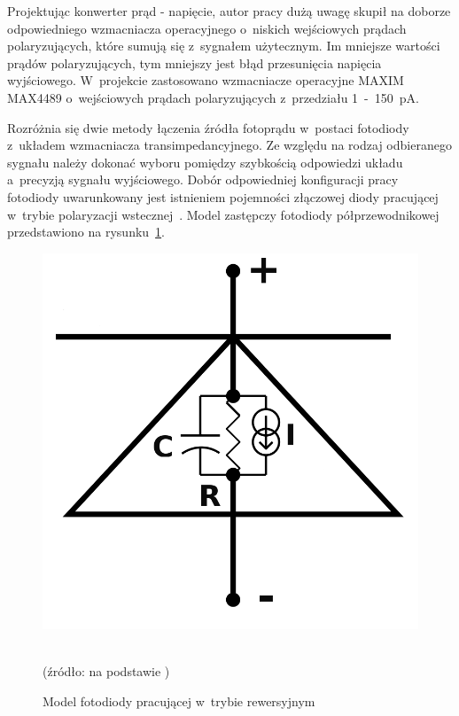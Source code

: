 Projektując konwerter prąd - napięcie, autor pracy dużą uwagę skupił na doborze odpowiedniego wzmacniacza operacyjnego o~niskich wejściowych prądach polaryzujących, które sumują się z~sygnałem użytecznym. 
Im mniejsze wartości prądów polaryzujących, tym mniejszy jest błąd przesunięcia napięcia wyjściowego. W~projekcie zastosowano wzmacniacze operacyjne MAXIM MAX4489 o~wejściowych prądach polaryzujących z~przedziału 
1~-~150~pA.

Rozróżnia się dwie metody łączenia źródła fotoprądu w~postaci fotodiody z~układem wzmacniacza transimpedancyjnego. Ze względu na rodzaj odbieranego sygnału należy dokonać wyboru pomiędzy szybkością 
odpowiedzi układu a~precyzją sygnału wyjściowego. Dobór odpowiedniej konfiguracji pracy fotodiody uwarunkowany jest istnieniem pojemności złączowej diody pracującej w~trybie polaryzacji wstecznej~\cite{Rako}. 
Model zastępczy fotodiody półprzewodnikowej przedstawiono na rysunku~\ref{rys:modelPIN}. 

\begin{figure}[ht]
	\centerline{\includegraphics[scale = 0.22]{graphic/modelPIN}}
	\caption{Model fotodiody pracującej w~trybie rewersyjnym}
	~\\
	(źródło: na podstawie \cite{Rako})
	\label{rys:modelPIN}
\end{figure}

